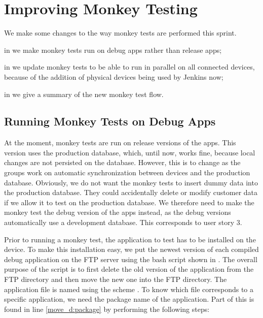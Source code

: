\chapter{Improving Monkey Testing}
We make some changes to the way monkey tests are performed this sprint.

\begin{chapterorganization}
  \item in  we make monkey tests run on debug apps rather than release apps;
  \item in  we update monkey tests to be able to run in parallel on all connected devices, because of the addition of physical devices being used by Jenkins now;
  \item in  we give a summary of the new monkey test flow.
\end{chapterorganization}

\section{Running Monkey Tests on Debug Apps}\label{sec:monkey_test_debug_app}
At the moment, monkey tests are run on release versions of the apps. This version uses the production database, which, until now, works fine, because local changes are not persisted on the database. However, this is to change as the \db{} groups work on automatic synchronization between devices and the production database. Obviously, we do not want the monkey tests to insert dummy data into the production database. They could accidentally delete or modify customer data if we allow it to test on the production database. We therefore need to make the monkey test the debug version of the apps instead, as the debug versions automatically use a development database. This corresponds to user story 3.

Prior to running a monkey test, the application to test has to be installed on the device. To make this installation easy, we put the newest version of each compiled debug application on the FTP server using the bash script shown in . The overall purpose of the script is to first delete the old version of the application from the FTP directory and then move the new one into the FTP directory. The application file is named using the scheme . To know which file corresponds to a specific application, we need the package name of the application. Part of this is found in line \ref{move_d:package} by performing the following steps:

